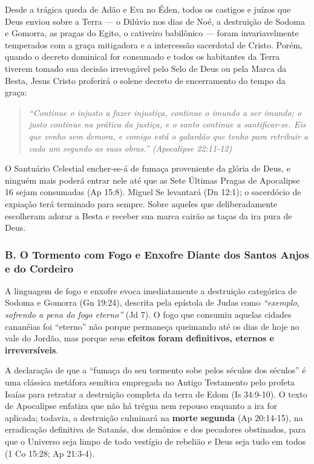 \documentclass[11pt,a4paper,openany]{book}
\begin{document}
Desde a trágica queda de Adão e Eva no Éden, todos os castigos e juízos que Deus enviou sobre a Terra — o Dilúvio nos dias de Noé, a destruição de Sodoma e Gomorra, as pragas do Egito, o cativeiro babilônico — foram invariavelmente temperados com a graça mitigadora e a intercessão sacerdotal de Cristo. Porém, quando o decreto dominical for consumado e todos os habitantes da Terra tiverem tomado sua decisão irrevogável pelo Selo de Deus ou pela Marca da Besta, Jesus Cristo proferirá o solene decreto de encerramento do tempo da graça:


\begin{quote}
\itshape \textit{``Continue o injusto a fazer injustiça, continue o imundo a ser imundo; o justo continue na prática da justiça, e o santo continue a santificar-se. Eis que venho sem demora, e comigo está o galardão que tenho para retribuir a cada um segundo as suas obras.''} (Apocalipse 22:11-12)
\end{quote}


O Santuário Celestial encher-se-á de fumaça proveniente da glória de Deus, e ninguém mais poderá entrar nele até que as Sete Últimas Pragas de Apocalipse 16 sejam consumadas (Ap 15:8). Miguel Se levantará (Dn 12:1); o sacerdócio de expiação terá terminado para sempre. Sobre aqueles que deliberadamente escolheram adorar a Besta e receber sua marca cairão as taças da ira pura de Deus.


\subsubsection*{B. O Tormento com Fogo e Enxofre Diante dos Santos Anjos e do Cordeiro}

A linguagem de fogo e enxofre evoca imediatamente a destruição categórica de Sodoma e Gomorra (Gn 19:24), descrita pela epístola de Judas como \textit{``exemplo, sofrendo a pena do fogo eterno''} (Jd 7). O fogo que consumiu aquelas cidades cananéias foi ``eterno'' não porque permaneça queimando até os dias de hoje no vale do Jordão, mas porque seus \textbf{efeitos foram definitivos, eternos e irreversíveis}.

A declaração de que a ``fumaça do seu tormento sobe pelos séculos dos séculos'' é uma clássica metáfora semítica empregada no Antigo Testamento pelo profeta Isaías para retratar a destruição completa da terra de Edom (Is 34:9-10). O texto de Apocalipse enfatiza que não há trégua nem repouso enquanto a ira for aplicada; todavia, a destruição culminará na \textbf{morte segunda} (Ap 20:14-15), na erradicação definitiva de Satanás, dos demônios e dos pecadores obstinados, para que o Universo seja limpo de todo vestígio de rebelião e Deus seja tudo em todos (1 Co 15:28; Ap 21:3-4).
\end{document}
